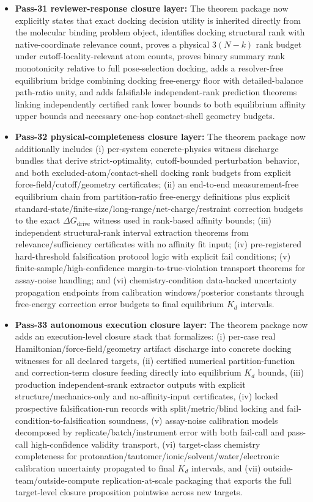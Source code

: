 \begin{itemize}
\item \textbf{Pass-31 reviewer-response closure layer:} The theorem package now explicitly states that exact docking decision utility is inherited directly from the molecular binding problem object, identifies docking structural rank with native-coordinate relevance count, proves a physical $3(N-k)$ rank budget under cutoff-locality-relevant atom counts, proves binary summary rank monotonicity relative to full pose-selection docking, adds a resolver-free equilibrium bridge combining docking free-energy floor with detailed-balance path-ratio unity, and adds falsifiable independent-rank prediction theorems linking independently certified rank lower bounds to both equilibrium affinity upper bounds and necessary one-hop contact-shell geometry budgets.
\item \textbf{Pass-32 physical-completeness closure layer:} The theorem package now additionally includes (i) per-system concrete-physics witness discharge bundles that derive strict-optimality, cutoff-bounded perturbation behavior, and both excluded-atom/contact-shell docking rank budgets from explicit force-field/cutoff/geometry certificates; (ii) an end-to-end measurement-free equilibrium chain from partition-ratio free-energy definitions plus explicit standard-state/finite-size/long-range/net-charge/restraint correction budgets to the exact $\Delta G_{\mathrm{drive}}$ witness used in rank-based affinity bounds; (iii) independent structural-rank interval extraction theorems from relevance/sufficiency certificates with no affinity fit input; (iv) pre-registered hard-threshold falsification protocol logic with explicit fail conditions; (v) finite-sample/high-confidence margin-to-true-violation transport theorems for assay-noise handling; and (vi) chemistry-condition data-backed uncertainty propagation endpoints from calibration windows/posterior constants through free-energy correction error budgets to final equilibrium $K_d$ intervals.
\item \textbf{Pass-33 autonomous execution closure layer:} The theorem package now adds an execution-level closure stack that formalizes: (i) per-case real Hamiltonian/force-field/geometry artifact discharge into concrete docking witnesses for all declared targets, (ii) certified numerical partition-function and correction-term closure feeding directly into equilibrium $K_d$ bounds, (iii) production independent-srank extractor outputs with explicit structure/mechanics-only and no-affinity-input certificates, (iv) locked prospective falsification-run records with split/metric/blind locking and fail-condition-to-falsification soundness, (v) assay-noise calibration models decomposed by replicate/batch/instrument error with both fail-call and pass-call high-confidence validity transport, (vi) target-class chemistry completeness for protonation/tautomer/ionic/solvent/water/electronic calibration uncertainty propagated to final $K_d$ intervals, and (vii) outside-team/outside-compute replication-at-scale packaging that exports the full target-level closure proposition pointwise across new targets.

\end{itemize}
